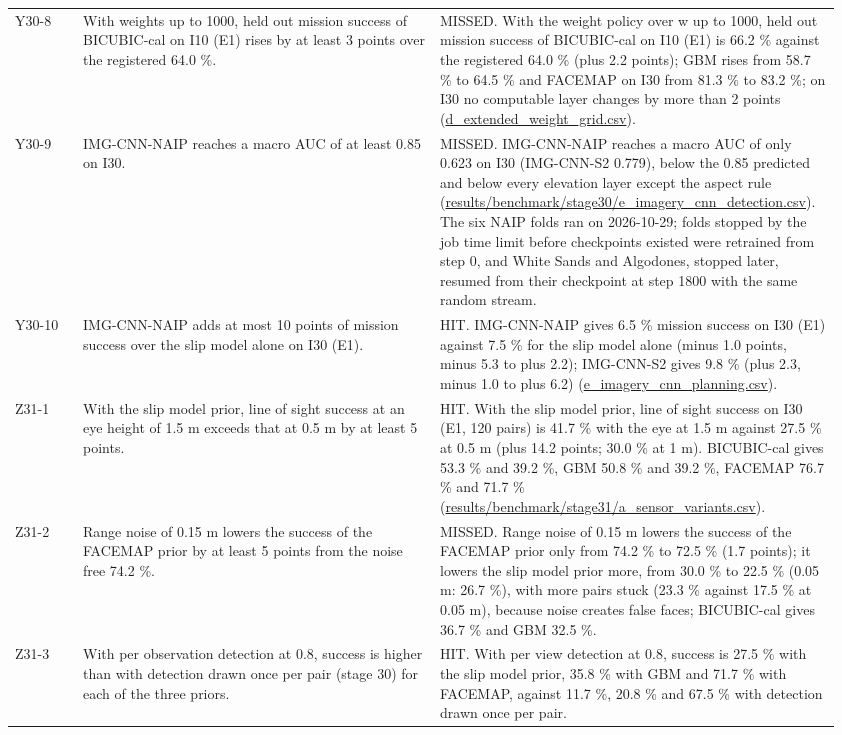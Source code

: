 \documentclass[10pt]{article}
\begin{document}
\begin{longtable}{@{}p{0.08\linewidth}p{0.42\linewidth}p{0.46\linewidth}@{}}
Y30-8 & With weights up to 1000, held out mission success of BICUBIC-cal on I10 (E1) rises by at least 3 points over the registered 64.0 \%. & MISSED. With the weight policy over w up to 1000, held out mission success of BICUBIC-cal on I10 (E1) is 66.2 \% against the registered 64.0 \% (plus 2.2 points); GBM rises from 58.7 \% to 64.5 \% and FACEMAP on I30 from 81.3 \% to 83.2 \%; on I30 no computable layer changes by more than 2 points (\url{d_extended_weight_grid.csv}). \\
Y30-9 & IMG-CNN-NAIP reaches a macro AUC of at least 0.85 on I30. & MISSED. IMG-CNN-NAIP reaches a macro AUC of only 0.623 on I30 (IMG-CNN-S2 0.779), below the 0.85 predicted and below every elevation layer except the aspect rule (\url{results/benchmark/stage30/e_imagery_cnn_detection.csv}). The six NAIP folds ran on 2026-10-29; folds stopped by the job time limit before checkpoints existed were retrained from step 0, and White Sands and Algodones, stopped later, resumed from their checkpoint at step 1800 with the same random stream. \\
Y30-10 & IMG-CNN-NAIP adds at most 10 points of mission success over the slip model alone on I30 (E1). & HIT. IMG-CNN-NAIP gives 6.5 \% mission success on I30 (E1) against 7.5 \% for the slip model alone (minus 1.0 points, minus 5.3 to plus 2.2); IMG-CNN-S2 gives 9.8 \% (plus 2.3, minus 1.0 to plus 6.2) (\url{e_imagery_cnn_planning.csv}). \\
Z31-1 & With the slip model prior, line of sight success at an eye height of 1.5 m exceeds that at 0.5 m by at least 5 points. & HIT. With the slip model prior, line of sight success on I30 (E1, 120 pairs) is 41.7 \% with the eye at 1.5 m against 27.5 \% at 0.5 m (plus 14.2 points; 30.0 \% at 1 m). BICUBIC-cal gives 53.3 \% and 39.2 \%, GBM 50.8 \% and 39.2 \%, FACEMAP 76.7 \% and 71.7 \% (\url{results/benchmark/stage31/a_sensor_variants.csv}). \\
Z31-2 & Range noise of 0.15 m lowers the success of the FACEMAP prior by at least 5 points from the noise free 74.2 \%. & MISSED. Range noise of 0.15 m lowers the success of the FACEMAP prior only from 74.2 \% to 72.5 \% (1.7 points); it lowers the slip model prior more, from 30.0 \% to 22.5 \% (0.05 m: 26.7 \%), with more pairs stuck (23.3 \% against 17.5 \% at 0.05 m), because noise creates false faces; BICUBIC-cal gives 36.7 \% and GBM 32.5 \%. \\
Z31-3 & With per observation detection at 0.8, success is higher than with detection drawn once per pair (stage 30) for each of the three priors. & HIT. With per view detection at 0.8, success is 27.5 \% with the slip model prior, 35.8 \% with GBM and 71.7 \% with FACEMAP, against 11.7 \%, 20.8 \% and 67.5 \% with detection drawn once per pair. \\

\end{longtable}
\end{document}
